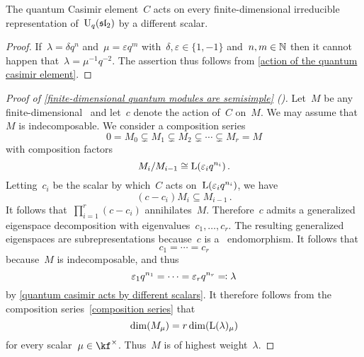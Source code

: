 \documentclass[a4paper, 11pt, oneside]{scrartcl}
\begin{document}
\begin{corollary}
  \label{quantum casimir acts by different scalars}
  The quantum Casimir element~$C$ acts on every finite-dimensional irreducible representation of~$\operatorname{U}_q(\mathfrak{sl}_2)$ by a different scalar.
\end{corollary}

\begin{proof}
  If~$\lambda = \delta q^n$ and~$\mu = \varepsilon q^m$ with~$\delta, \varepsilon \in \{1, -1\}$ and~$n, m \in \mathbb{N}$ then it cannot happen that~$\lambda = \mu^{-1} q^{-2}$.
  The assertion thus follows from \cref{action of the quantum casimir element}.
\end{proof}

\begin{proof}[Proof of \cref{finite-dimensional quantum modules are semisimple} ({\cite[Theorem~2.9]{jantzen_quantum}})]
  Let~$M$ be any finite-dimensional~ and let~$c$ denote the action of~$C$ on~$M$.
  We may assume that~$M$ is indecomposable.
  We consider a composition series
  \begin{equation}
    \label{composition series}
    0
    =
    M_0
    \subsetneq
    M_1
    \subsetneq
    M_2
    \subsetneq
    \dotsb
    \subsetneq
    M_r
    =
    M
  \end{equation}
  with composition factors
  \[
    M_i/M_{i-1}
    \cong
    \operatorname{L}(\varepsilon_i q^{n_i}) \,.
  \]
  Letting~$c_i$ be the scalar by which~$C$ acts on~$\operatorname{L}(\varepsilon_i q^{n_i})$, we have
  \[
    (c - c_i) M_i \subseteq M_{i-1} \,.
  \]
  It follows that~$\prod_{i=1}^r (c - c_i)$ annihilates~$M$.
  Therefore~$c$ admits a generalized eigenspace decomposition with eigenvalues~$c_1, \dotsc, c_r$.
  The resulting generalized eigenspaces are subrepresentations because~$c$ is a~ endomorphism.
  It follows that
  \[
    c_1 = \dotsb = c_r
  \]
  because~$M$ is indecomposable, and thus
  \[
    \varepsilon_1 q^{n_1}
    =
    \dotsb
    =
    \varepsilon_r q^{n_r}
    \eqqcolon
    \lambda
  \]
  by \cref{quantum casimir acts by different scalars}.
  It therefore follows from the composition series~\eqref{composition series} that
  \[
    \dim( M_\mu )
    =
    r \dim( \operatorname{L}(\lambda)_\mu )
  \]
  for every scalar~$\mu \in \kf^\times$.
  Thus~$M$ is of highest weight~$\lambda$.


\end{proof}
\end{document}
